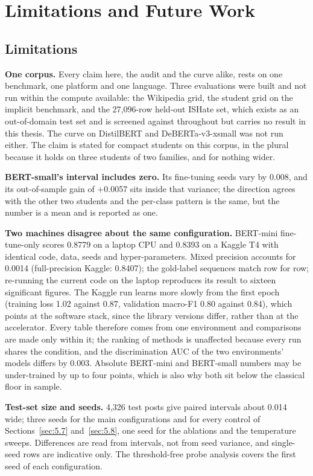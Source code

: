 \chapter{Limitations and Future Work}
\label{ch:7}
\section{Limitations}
\label{sec:7.1}
\textbf{One corpus.} Every claim here, the audit and the curve alike, rests on one benchmark, one
platform and one language. Three evaluations were built and not run within the compute available:
the Wikipedia grid, the student grid on the implicit benchmark, and the 27,096-row held-out ISHate
set, which exists as an out-of-domain test set and is screened against throughout but carries no
result in this thesis. The curve on DistilBERT and DeBERTa-v3-xsmall was not run either. The claim
is stated for compact students on this corpus, in the plural because it holds on three students of
two families, and for nothing wider.

\textbf{BERT-small's interval includes zero.} Its fine-tuning seeds vary by 0.008, and its
out-of-sample gain of +0.0057 sits inside that variance; the direction agrees with the other two
students and the per-class pattern is the same, but the number is a mean and is reported as one.

\textbf{Two machines disagree about the same configuration.} BERT-mini fine-tune-only scores 0.8779
on a laptop CPU and 0.8393 on a Kaggle T4 with identical code, data, seeds and hyper-parameters.
Mixed precision accounts for 0.0014 (full-precision Kaggle: 0.8407); the gold-label sequences match
row for row; re-running the current code on the laptop reproduces its result to sixteen significant
figures. The Kaggle run learns more slowly from the first epoch (training loss 1.02 against 0.87,
validation macro-F1 0.80 against 0.84), which points at the software stack, since the library
versions differ, rather than at the accelerator. Every table therefore comes from one environment
and comparisons are made only within it; the ranking of methods is unaffected because every run
shares the condition, and the discrimination AUC of the two environments' models differs by 0.003.
Absolute BERT-mini and BERT-small numbers may be under-trained by up to four points, which is also
why both sit below the classical floor in sample.

\textbf{Test-set size and seeds.} 4,326 test posts give paired intervals about 0.014 wide; three
seeds for the main configurations and for every control of Sections~\ref{sec:5.7} and~\ref{sec:5.8},
one seed for the ablations and the temperature sweeps. Differences are read from intervals, not from
seed variance, and single-seed rows are indicative only. The threshold-free probe analysis covers
the first seed of each configuration.


